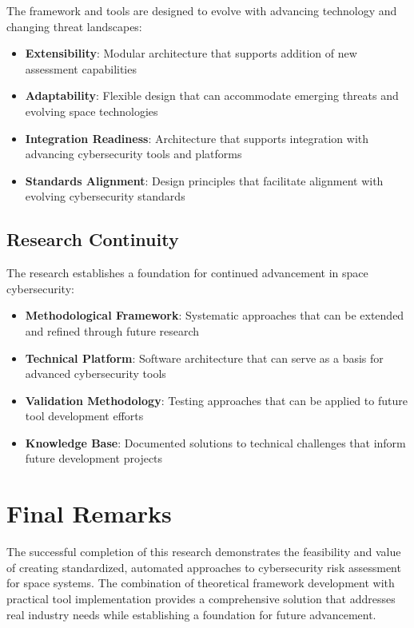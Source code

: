 \documentclass[binding=0.6cm]{sapthesis}
\begin{document}
The framework and tools are designed to evolve with advancing technology and changing threat landscapes:

\begin{itemize}
    \item \textbf{Extensibility}: Modular architecture that supports addition of new assessment capabilities
    \item \textbf{Adaptability}: Flexible design that can accommodate emerging threats and evolving space technologies
    \item \textbf{Integration Readiness}: Architecture that supports integration with advancing cybersecurity tools and platforms
    \item \textbf{Standards Alignment}: Design principles that facilitate alignment with evolving cybersecurity standards
\end{itemize}

\subsection{Research Continuity}

The research establishes a foundation for continued advancement in space cybersecurity:

\begin{itemize}
    \item \textbf{Methodological Framework}: Systematic approaches that can be extended and refined through future research
    \item \textbf{Technical Platform}: Software architecture that can serve as a basis for advanced cybersecurity tools
    \item \textbf{Validation Methodology}: Testing approaches that can be applied to future tool development efforts
    \item \textbf{Knowledge Base}: Documented solutions to technical challenges that inform future development projects
\end{itemize}

\section{Final Remarks}

The successful completion of this research demonstrates the feasibility and value of creating standardized, automated approaches to cybersecurity risk assessment for space systems. The combination of theoretical framework development with practical tool implementation provides a comprehensive solution that addresses real industry needs while establishing a foundation for future advancement.
\end{document}
